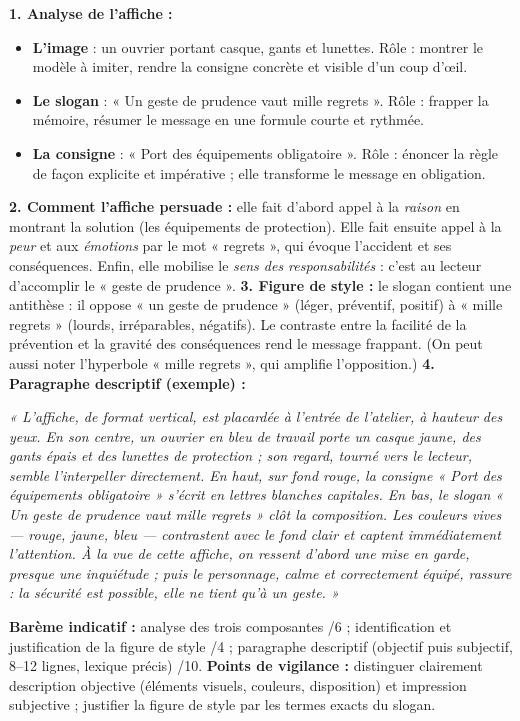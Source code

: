 \documentclass[11pt]{article}
\newcommand{\cle}[1]{{\popxbold\color{popdark}#1}}
\begin{document}
\begin{corrige}
\textbf{1. Analyse de l'affiche :}
\begin{itemize}
\item \textbf{L'image} : un ouvrier portant casque, gants et lunettes. Rôle : montrer le modèle à imiter, rendre la consigne concrète et visible d'un coup d'œil.
\item \textbf{Le slogan} : « Un geste de prudence vaut mille regrets ». Rôle : frapper la mémoire, résumer le message en une formule courte et rythmée.
\item \textbf{La consigne} : « Port des équipements obligatoire ». Rôle : énoncer la règle de façon explicite et impérative ; elle transforme le message en obligation.
\end{itemize}
\textbf{2. Comment l'affiche persuade :} elle fait d'abord appel à la \emph{raison} en montrant la solution (les équipements de protection). Elle fait ensuite appel à la \emph{peur} et aux \emph{émotions} par le mot « regrets », qui évoque l'accident et ses conséquences. Enfin, elle mobilise le \emph{sens des responsabilités} : c'est au lecteur d'accomplir le « geste de prudence ».
\textbf{3. Figure de style :} le slogan contient une \cle{antithèse} : il oppose « un geste de prudence » (léger, préventif, positif) à « mille regrets » (lourds, irréparables, négatifs). Le contraste entre la facilité de la prévention et la gravité des conséquences rend le message frappant. (On peut aussi noter l'hyperbole « mille regrets », qui amplifie l'opposition.)
\textbf{4. Paragraphe descriptif (exemple) :}
\begin{center}
\emph{« L'affiche, de format vertical, est placardée à l'entrée de l'atelier, à hauteur des yeux. En son centre, un ouvrier en bleu de travail porte un casque jaune, des gants épais et des lunettes de protection ; son regard, tourné vers le lecteur, semble l'interpeller directement. En haut, sur fond rouge, la consigne « Port des équipements obligatoire » s'écrit en lettres blanches capitales. En bas, le slogan « Un geste de prudence vaut mille regrets » clôt la composition. Les couleurs vives — rouge, jaune, bleu — contrastent avec le fond clair et captent immédiatement l'attention. À la vue de cette affiche, on ressent d'abord une mise en garde, presque une inquiétude ; puis le personnage, calme et correctement équipé, rassure : la sécurité est possible, elle ne tient qu'à un geste. »}
\end{center}
\textbf{Barème indicatif :} analyse des trois composantes /6 ; identification et justification de la figure de style /4 ; paragraphe descriptif (objectif puis subjectif, 8--12 lignes, lexique précis) /10.
\textbf{Points de vigilance :} distinguer clairement description objective (éléments visuels, couleurs, disposition) et impression subjective ; justifier la figure de style par les termes exacts du slogan.
\end{corrige}
\end{document}
